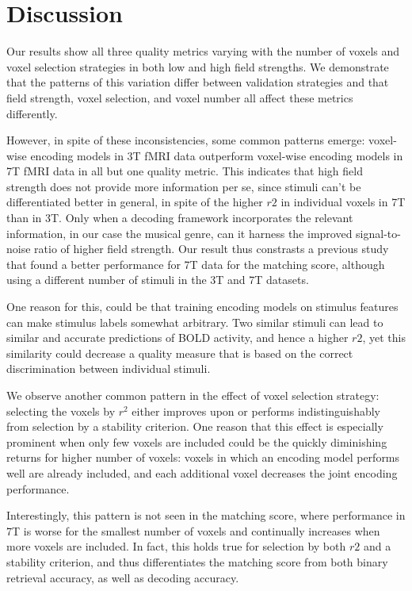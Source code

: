 \section*{Discussion}

Our results show all three quality metrics varying with the number of
voxels and voxel selection strategies in both low and high field strengths.
We demonstrate that the patterns of this variation differ between validation strategies
and that field strength, voxel selection, and voxel number all affect these metrics
differently.

However, in spite of these inconsistencies, some common patterns emerge:
voxel-wise encoding models in 3T f{MRI} data outperform voxel-wise encoding models in
7T f{MRI} data in all but one quality metric.
This indicates that high field strength does not provide more information per
se, since stimuli can't be differentiated better in general, in spite of the higher
$r2$ in individual voxels in 7T than in 3T.
Only when a decoding framework incorporates the relevant information, in our
case the musical genre, can it harness the improved signal-to-noise ratio of
higher field strength.
Our result thus constrasts a  previous study \citep{SF14} that found a better
performance for 7T data for the matching score, although using a different
number of stimuli in the 3T and 7T datasets.

One reason for this, could be that training encoding models on stimulus features
can make stimulus labels somewhat arbitrary.
Two similar stimuli can lead to similar and accurate predictions of BOLD activity,
and hence a higher $r2$,  yet this similarity could decrease a quality measure
that is based on the correct discrimination between individual stimuli.

We observe another common pattern in the effect of voxel selection strategy:
selecting the voxels by $r^2$ either improves upon or performs indistinguishably
from selection by a stability criterion.
One reason that this effect is especially prominent when only few voxels are included could
be the quickly diminishing returns for higher number of voxels: voxels in which 
an encoding model performs well are already included, and each additional voxel
decreases the joint encoding performance.

Interestingly, this pattern is not seen in the
matching score, where performance in 7T is worse for the smallest number
of voxels and continually increases when more voxels are included.
In fact, this holds true for selection by both $r2$ and a stability criterion,
and thus differentiates the matching score from both binary retrieval accuracy,
as well as decoding accuracy.

